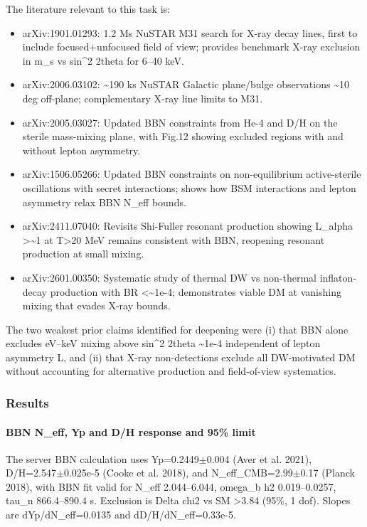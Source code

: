 \documentclass[11pt,a4paper]{article}
\begin{document}
The literature relevant to this task is:

\begin{itemize}
  \item arXiv:1901.01293: 1.2 Ms NuSTAR M31 search for X-ray decay lines, first to include focused+unfocused field of view; provides benchmark X-ray exclusion in m\_s vs sin\textasciicircum{}2 2theta for 6--40 keV.
  \item arXiv:2006.03102: \textasciitilde{}190 ks NuSTAR Galactic plane/bulge observations \textasciitilde{}10 deg off-plane; complementary X-ray line limits to M31.
  \item arXiv:2005.03027: Updated BBN constraints from He-4 and D/H on the sterile mass-mixing plane, with Fig.12 showing excluded regions with and without lepton asymmetry.
  \item arXiv:1506.05266: Updated BBN constraints on non-equilibrium active-sterile oscillations with secret interactions; shows how BSM interactions and lepton asymmetry relax BBN N\_eff bounds.
  \item arXiv:2411.07040: Revisits Shi-Fuller resonant production showing L\_alpha \textgreater{}\textasciitilde{}1 at T\textgreater{}20 MeV remains consistent with BBN, reopening resonant production at small mixing.
  \item arXiv:2601.00350: Systematic study of thermal DW vs non-thermal inflaton-decay production with BR \textless{}\textasciitilde{}1e-4; demonstrates viable DM at vanishing mixing that evades X-ray bounds.
\end{itemize}
The two weakest prior claims identified for deepening were (i) that BBN alone excludes eV--keV mixing above sin\textasciicircum{}2 2theta \textasciitilde{}1e-4 independent of lepton asymmetry L, and (ii) that X-ray non-detections exclude all DW-motivated DM without accounting for alternative production and field-of-view systematics.

\subsubsection*{Results}
\paragraph{BBN N\_eff, Yp and D/H response and 95\% limit}
The server BBN calculation uses Yp=0.2449$\pm$0.004 (Aver et al. 2021), D/H=2.547$\pm$0.025e-5 (Cooke et al. 2018), and N\_eff\_CMB=2.99$\pm$0.17 (Planck 2018), with BBN fit valid for N\_eff 2.044--6.044, omega\_b h2 0.019--0.0257, tau\_n 866.4--890.4 s. Exclusion is Delta chi2 vs SM \textgreater{}3.84 (95\%, 1 dof). Slopes are dYp/dN\_eff=0.0135 and dD/H/dN\_eff=0.33e-5.
\end{document}
